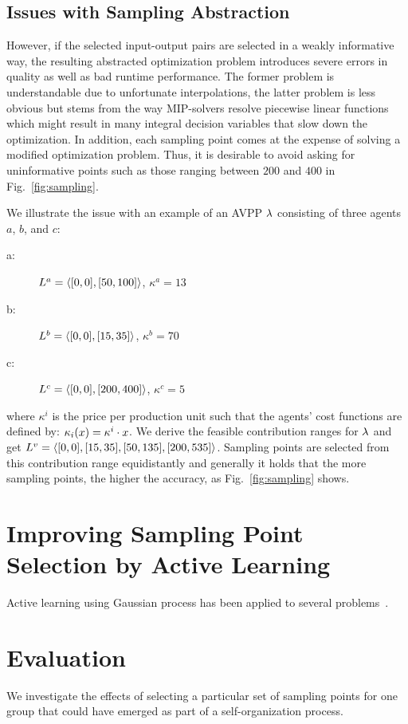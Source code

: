 \documentclass[conference]{IEEEtran}
\newcommand{\fref}[1]{Fig.~\ref{#1}}
\begin{document}
\subsection{Issues with Sampling Abstraction}
However, if the selected input-output pairs are selected in a weakly informative way, the resulting abstracted
optimization problem introduces severe errors in quality as well as bad runtime performance. The former problem
is understandable due to unfortunate interpolations, the latter problem is less obvious but stems from the way MIP-solvers
resolve piecewise linear functions which might result in many integral decision variables that slow down the optimization.
In addition, each sampling point comes at the expense of solving a modified optimization problem. Thus, it is desirable
to avoid asking for uninformative points such as those ranging between $200$ and $400$ in \fref{fig:sampling}.

We illustrate the issue with an example of an AVPP $\lambda$ consisting of three agents $a$, $b$, and $c$:
%
\begin{description}
\item[a:] $L^a = \langle [0,0], [50, 100] \rangle$, $\kappa^a = 13$
\item[b:] $L^b = \langle [0,0], [15, 35] \rangle$, $\kappa^b = 70$
\item[c:] $L^c = \langle [0,0], [200, 400] \rangle$, $\kappa^c = 5$
\end{description}
where $\kappa^i$ is the price per production unit such that the agents' cost functions are defined by: $\kappa_{i}(x) = \kappa^i \cdot x$. We
derive the feasible contribution ranges for $\lambda$ and get $L^v = \langle [0, 0], [15, 35], [50, 135], [200, 535] \rangle$. 
Sampling points are selected from this contribution range equidistantly and generally it holds that the more sampling points, the higher the accuracy, 
as \fref{fig:sampling} shows. 

\section{Improving Sampling Point Selection by Active Learning}
Active learning using Gaussian process has been applied to several problems~\cite{Krause2007,Krause2008,Park2011}. 

\section{Evaluation}
We investigate the effects of selecting a particular set of 
sampling points for one group that could have emerged as part
of a self-organization process.





\end{document}

